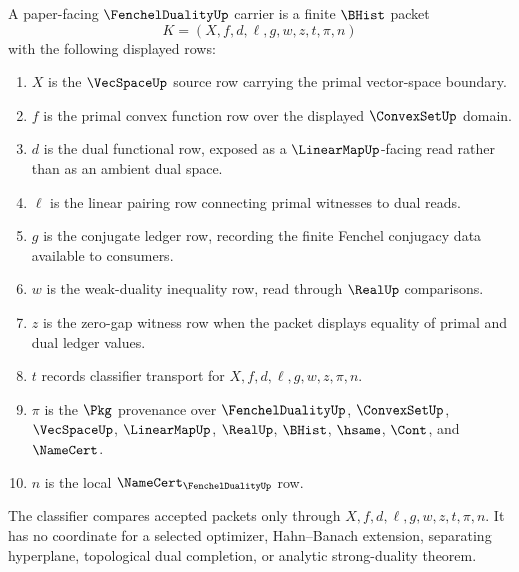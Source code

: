 \begin{definition}
\label{def:fenchel-duality-carrier}
A paper-facing $\FenchelDualityUp$ carrier is a finite $\BHist$ packet
$$
K=(X,f,d,\ell,g,w,z,t,\pi,n)
$$
with the following displayed rows:
\begin{enumerate}
\item $X$ is the $\VecSpaceUp$ source row carrying the primal vector-space boundary.
\item $f$ is the primal convex function row over the displayed $\ConvexSetUp$ domain.
\item $d$ is the dual functional row, exposed as a $\LinearMapUp$-facing read rather than as an ambient dual space.
\item $\ell$ is the linear pairing row connecting primal witnesses to dual reads.
\item $g$ is the conjugate ledger row, recording the finite Fenchel conjugacy data available to consumers.
\item $w$ is the weak-duality inequality row, read through $\RealUp$ comparisons.
\item $z$ is the zero-gap witness row when the packet displays equality of primal and dual ledger values.
\item $t$ records classifier transport for $X,f,d,\ell,g,w,z,\pi,n$.
\item $\pi$ is the $\Pkg$ provenance over $\FenchelDualityUp$, $\ConvexSetUp$, $\VecSpaceUp$, $\LinearMapUp$, $\RealUp$, $\BHist$, $\hsame$, $\Cont$, and $\NameCert$.
\item $n$ is the local $\NameCert_{\FenchelDualityUp}$ row.
\end{enumerate}
The classifier compares accepted packets only through $X,f,d,\ell,g,w,z,t,\pi,n$. It has no coordinate for a selected optimizer, Hahn--Banach extension, separating hyperplane, topological dual completion, or analytic strong-duality theorem.
\end{definition}

